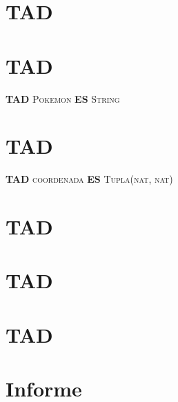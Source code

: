 \documentclass[10pt, a4paper]{article}
\begin{document}
\maketitle

\thispagestyle{fancy}


\tableofcontents

\pagebreak

\section{TAD }


\section{TAD }

\textbf{TAD} \textsc{Pokemon} \textbf{ES} \textsc{String}

\section{TAD }

\textbf{TAD} \textsc{coordenada} \textbf{ES} \textsc{Tupla(nat, nat)}


\newpage


\section{TAD }



%

\newpage
\section{TAD }




\newpage
\section{TAD }



\newpage
\section{Informe}


\end{document}
